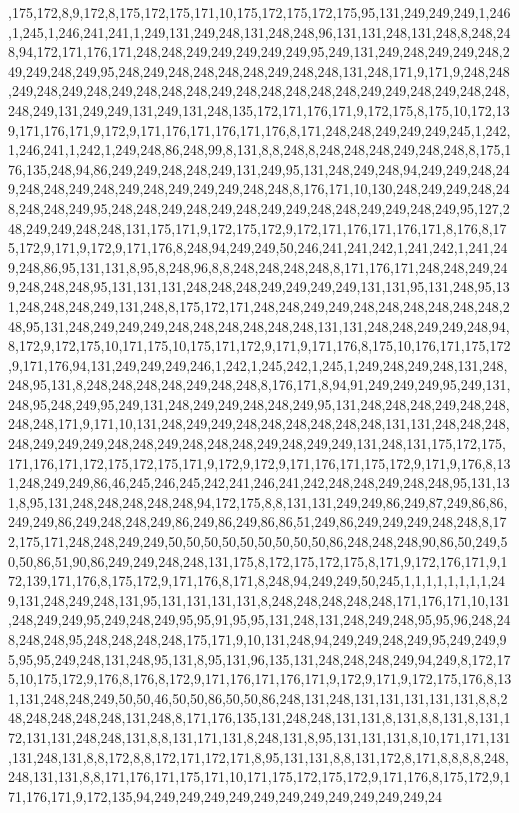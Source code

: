 ,175,172,8,9,172,8,175,172,175,171,10,175,172,175,172,175,95,131,249,249,249,1,246,1,245,1,246,241,241,1,249,131,249,248,131,248,248,96,131,131,248,131,248,8,248,248,94,172,171,176,171,248,248,249,249,249,249,249,95,249,131,249,248,249,249,248,249,249,248,249,95,248,249,248,248,248,248,249,248,248,131,248,171,9,171,9,248,248,249,248,249,248,249,248,248,248,249,248,248,248,248,248,249,249,248,249,248,248,248,249,131,249,249,131,249,131,248,135,172,171,176,171,9,172,175,8,175,10,172,139,171,176,171,9,172,9,171,176,171,176,171,176,8,171,248,248,249,249,249,245,1,242,1,246,241,1,242,1,249,248,86,248,99,8,131,8,8,248,8,248,248,248,249,248,248,8,175,176,135,248,94,86,249,249,248,248,249,131,249,95,131,248,249,248,94,249,249,248,249,248,248,249,248,249,248,249,249,249,248,248,8,176,171,10,130,248,249,249,248,248,248,248,249,95,248,248,249,248,249,248,249,249,248,248,249,249,248,249,95,127,248,249,249,248,248,131,175,171,9,172,175,172,9,172,171,176,171,176,171,8,176,8,175,172,9,171,9,172,9,171,176,8,248,94,249,249,50,246,241,241,242,1,241,242,1,241,249,248,86,95,131,131,8,95,8,248,96,8,8,248,248,248,248,8,171,176,171,248,248,249,249,248,248,248,95,131,131,131,248,248,248,249,249,249,249,131,131,95,131,248,95,131,248,248,248,249,131,248,8,175,172,171,248,248,249,249,248,248,248,248,248,248,248,95,131,248,249,249,249,248,248,248,248,248,248,131,131,248,248,249,249,248,94,8,172,9,172,175,10,171,175,10,175,171,172,9,171,9,171,176,8,175,10,176,171,175,172,9,171,176,94,131,249,249,249,246,1,242,1,245,242,1,245,1,249,248,249,248,131,248,248,95,131,8,248,248,248,248,249,248,248,8,176,171,8,94,91,249,249,249,95,249,131,248,95,248,249,95,249,131,248,249,249,248,248,249,95,131,248,248,248,249,248,248,248,248,171,9,171,10,131,248,249,249,248,248,248,248,248,248,131,131,248,248,248,248,249,249,249,248,248,249,248,248,248,249,248,249,249,131,248,131,175,172,175,171,176,171,172,175,172,175,171,9,172,9,172,9,171,176,171,175,172,9,171,9,176,8,131,248,249,249,86,46,245,246,245,242,241,246,241,242,248,248,249,248,248,95,131,131,8,95,131,248,248,248,248,248,94,172,175,8,8,131,131,249,249,86,249,87,249,86,86,249,249,86,249,248,248,249,86,249,86,249,86,86,51,249,86,249,249,249,248,248,8,172,175,171,248,248,249,249,50,50,50,50,50,50,50,50,50,86,248,248,248,90,86,50,249,50,50,86,51,90,86,249,249,248,248,131,175,8,172,175,172,175,8,171,9,172,176,171,9,172,139,171,176,8,175,172,9,171,176,8,171,8,248,94,249,249,50,245,1,1,1,1,1,1,1,1,249,131,248,249,248,131,95,131,131,131,131,8,248,248,248,248,248,171,176,171,10,131,248,249,249,95,249,248,249,95,95,91,95,95,131,248,131,248,249,248,95,95,96,248,248,248,248,95,248,248,248,248,175,171,9,10,131,248,94,249,249,248,249,95,249,249,95,95,95,249,248,131,248,95,131,8,95,131,96,135,131,248,248,248,249,94,249,8,172,175,10,175,172,9,176,8,176,8,172,9,171,176,171,176,171,9,172,9,171,9,172,175,176,8,131,131,248,248,249,50,50,46,50,50,86,50,50,86,248,131,248,131,131,131,131,131,8,8,248,248,248,248,248,131,248,8,171,176,135,131,248,248,131,131,8,131,8,8,131,8,131,172,131,131,248,248,131,8,8,131,171,131,8,248,131,8,95,131,131,131,8,10,171,171,131,131,248,131,8,8,172,8,8,172,171,172,171,8,95,131,131,8,8,131,172,8,171,8,8,8,8,248,248,131,131,8,8,171,176,171,175,171,10,171,175,172,175,172,9,171,176,8,175,172,9,171,176,171,9,172,135,94,249,249,249,249,249,249,249,249,249,249,249,24
